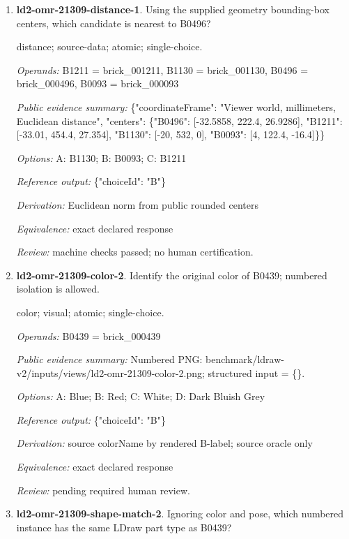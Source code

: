 \begin{enumerate}
\item \textbf{ld2-omr-21309-distance-1}. Using the supplied geometry bounding-box centers, which candidate is nearest to B0496?
\par{\small distance; source-data; atomic; single-choice.\par\textit{Operands:} B1211 = brick\_001211, B1130 = brick\_001130, B0496 = brick\_000496, B0093 = brick\_000093\par\textit{Public evidence summary:} \{"coordinateFrame": "Viewer world, millimeters, Euclidean distance", "centers": \{"B0496": [-32.5858, 222.4, 26.9286], "B1211": [-33.01, 454.4, 27.354], "B1130": [-20, 532, 0], "B0093": [4, 122.4, -16.4]\}\}\par\textit{Options:} A: B1130; B: B0093; C: B1211\par\textit{Reference output:} \{"choiceId": "B"\}\par\textit{Derivation:} Euclidean norm from public rounded centers\par\textit{Equivalence:} exact declared response\par\textit{Review:} machine checks passed; no human certification.}
\item \textbf{ld2-omr-21309-color-2}. Identify the original color of B0439; numbered isolation is allowed.
\par{\small color; visual; atomic; single-choice.\par\textit{Operands:} B0439 = brick\_000439\par\textit{Public evidence summary:} Numbered PNG: benchmark/ldraw-v2/inputs/views/ld2-omr-21309-color-2.png; structured input = \{\}.\par\textit{Options:} A: Blue; B: Red; C: White; D: Dark Bluish Grey\par\textit{Reference output:} \{"choiceId": "B"\}\par\textit{Derivation:} source colorName by rendered B-label; source oracle only\par\textit{Equivalence:} exact declared response\par\textit{Review:} pending required human review.}
\item \textbf{ld2-omr-21309-shape-match-2}. Ignoring color and pose, which numbered instance has the same LDraw part type as B0439?

\end{enumerate}
